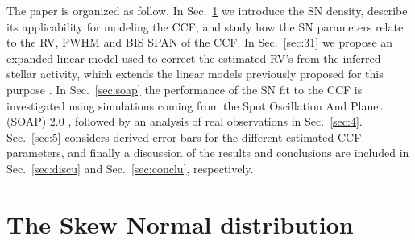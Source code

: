 \documentclass{aa}
\begin{document}
The paper is organized as follow. In Sec.~\ref{sec:2} we introduce the SN density, describe its applicability for modeling the CCF, and study how the SN parameters relate to the RV, FWHM and BIS SPAN of the CCF. 
%
In Sec.~\ref{sec:31} we propose an expanded linear model used to correct the estimated RV's from the inferred stellar activity, which extends the linear models previously proposed for this purpose \citep{Dumusque:2017aa,Feng:2017aa}. 
%
In Sec.~\ref{sec:soap} the performance of the SN fit to the CCF is investigated using simulations coming from the Spot Oscillation And Planet (SOAP) 2.0 \citep{Dumusque-2014b}, followed by an analysis of real observations in Sec.~\ref{sec:4}.
%
Sec.~\ref{sec:5} considers derived error bars for the different estimated CCF parameters, and finally a discussion of the results and conclusions are included in Sec.~\ref{sec:discu} and Sec.~\ref{sec:conclu}, respectively.

\section{The Skew Normal distribution} \label{sec:2}
\end{document}
